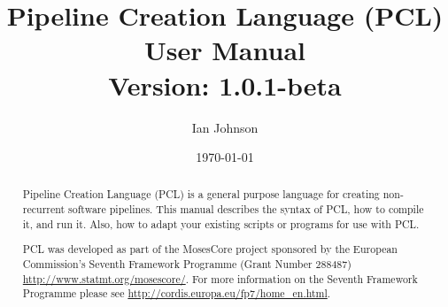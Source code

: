 \documentclass[11pt,a4paper,openright]{report}
\newcommand{\ReleaseVersion}{1.0.1-beta}
\begin{document}
\title{\huge{Pipeline Creation Language (PCL)}\\
\LARGE{User Manual}\\
\normalsize{Version: \ReleaseVersion}}
\author{Ian Johnson}
\date{\today}

\maketitle

\onehalfspacing

\begin{abstract}
Pipeline Creation Language (PCL) is a general purpose language for creating non-recurrent software pipelines. This manual describes the syntax of PCL, how to compile it, and run it. Also, how to adapt your existing scripts or programs for use with PCL.

PCL was developed as part of the MosesCore project sponsored by the European Commission's Seventh Framework Programme (Grant Number 288487) \url{http://www.statmt.org/mosescore/}. For more information on the Seventh Framework Programme please see \url{http://cordis.europa.eu/fp7/home_en.html}.
\end{abstract}


\tableofcontents
\listoffigures

\cleardoublepage
\setcounter{page}{1}






%
\end{document}
